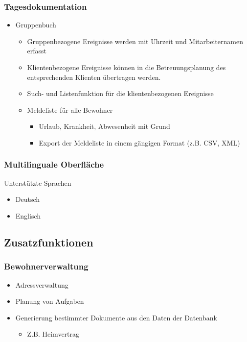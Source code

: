 \documentclass[a4paper,10pt]{article}
\begin{document}
\subsubsection{Tagesdokumentation}
\begin{itemize}
	\item Gruppenbuch
	\begin{itemize}
		\item Gruppenbezogene Ereignisse werden mit Uhrzeit und Mitarbeiternamen erfasst
		\item Klientenbezogene Ereignisse können in die Betreuungsplanung des entsprechenden Klienten übertragen werden.
		\item Such- und Listenfunktion für die klientenbezogenen Ereignisse
		\item Meldeliste für alle Bewohner
		\begin{itemize}
			\item Urlaub, Krankheit, Abwesenheit mit Grund
			\item Export der Meldeliste in einem gängigen Format (z.B. CSV, XML)
		\end{itemize}
	\end{itemize}
\end{itemize}
\subsubsection{Multilinguale Oberfläche}
Unterstützte Sprachen
\begin{itemize}
 \item Deutsch
 \item Englisch
\end{itemize}


\subsection{Zusatzfunktionen}

\subsubsection{Bewohnerverwaltung}
\begin{itemize}
	\item Adressverwaltung
	\item Planung von Aufgaben
	\item Generierung bestimmter Dokumente aus den Daten der Datenbank
	\begin{itemize}
		\item Z.B. Heimvertrag
	\end{itemize}
\end{itemize}
\end{document}
